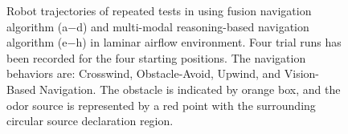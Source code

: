 \begin{figure}[h!]
\begin{center}
\end{center}
\vspace{-.1in}

\caption
{Robot trajectories of repeated tests in using fusion navigation algorithm (a$-$d) and multi-modal reasoning-based navigation algorithm (e$-$h) in laminar airflow environment. Four trial runs has been recorded for the four starting positions. The navigation behaviors are: Crosswind, Obstacle-Avoid, Upwind, and Vision-Based Navigation. The obstacle is indicated by orange box, and the odor source is represented by a red point with the surrounding circular source declaration region.}
\label{fig:LLMe1TrajectoriesLaminar}
\end{figure}

